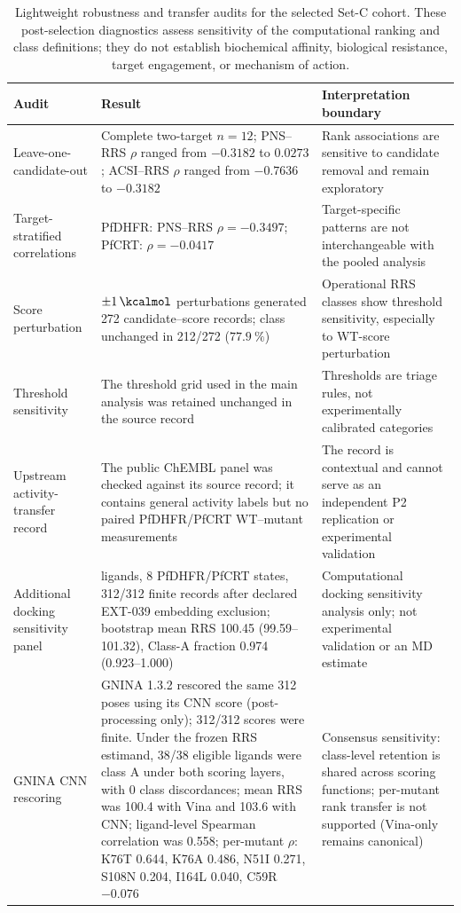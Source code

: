 \begin{table}[htbp]
\centering
\footnotesize
\caption{Lightweight robustness and transfer audits for the selected Set-C cohort. These post-selection diagnostics assess sensitivity of the computational ranking and class definitions; they do not establish biochemical affinity, biological resistance, target engagement, or mechanism of action.}
\label{tab:s15_robustness_transfer}
\begin{tabularx}{\textwidth}{@{}>{\raggedright\arraybackslash}p{} >{\raggedright\arraybackslash}p{} X@{}}
\toprule
Audit & Result & Interpretation boundary \\
\midrule
Leave-one-candidate-out & Complete two-target $n=\num{12}$; PNS--RRS $\rho$ ranged from $-0.3182$ to $0.0273$; ACSI--RRS $\rho$ ranged from $-0.7636$ to $-0.3182$ & Rank associations are sensitive to candidate removal and remain exploratory \\
Target-stratified correlations & PfDHFR: PNS--RRS $\rho=-0.3497$; PfCRT: $\rho=-0.0417$ & Target-specific patterns are not interchangeable with the pooled analysis \\
Score perturbation & $\pm\qty{1}{\kcalmol}$ perturbations generated 272 candidate--score records; class unchanged in 212/272 ($\qty{77.9}{\percent}$) & Operational RRS classes show threshold sensitivity, especially to WT-score perturbation \\
Threshold sensitivity & The threshold grid used in the main analysis was retained unchanged in the source record & Thresholds are triage rules, not experimentally calibrated categories \\
Upstream activity-transfer record & The public ChEMBL panel was checked against its source record; it contains general activity labels but no paired PfDHFR/PfCRT WT--mutant measurements & The record is contextual and cannot serve as an independent P2 replication or experimental validation \\
Additional docking sensitivity panel & 39 ligands, 8 PfDHFR/PfCRT states, 312/312 finite records after declared EXT-039 embedding exclusion; bootstrap mean RRS \num{100.45} (\numrange{99.59}{101.32}), Class-A fraction \num{0.974} (\numrange{0.923}{1.000}) & Computational docking sensitivity analysis only; not experimental validation or an MD estimate \\
GNINA CNN rescoring & GNINA 1.3.2 rescored the same 312 poses using its CNN score (post-processing only); 312/312 scores were finite. Under the frozen RRS estimand, 38/38 eligible ligands were class A under both scoring layers, with 0 class discordances; mean RRS was \num{100.4} with Vina and \num{103.6} with CNN; ligand-level Spearman correlation was \num{0.558}; per-mutant $\rho$: K76T \num{0.644}, K76A \num{0.486}, N51I \num{0.271}, S108N \num{0.204}, I164L \num{0.040}, C59R $-0.076$ & Consensus sensitivity: class-level retention is shared across scoring functions; per-mutant rank transfer is not supported (Vina-only remains canonical) \\

\end{tabularx}
\end{table}
